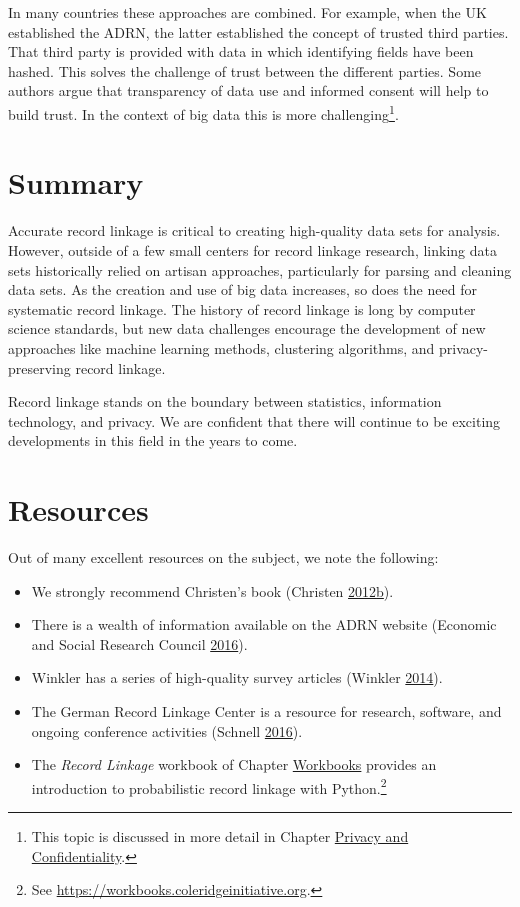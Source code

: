 \documentclass[]{krantz}
\begin{document}
In many countries these approaches are combined. For example, when the
UK established the ADRN, the latter established the concept of trusted
third parties. That third party is provided with data in which
identifying fields have been hashed. This solves the challenge of trust
between the different parties. Some authors argue that transparency of
data use and informed consent will help to build trust. In the context
of big data this is more challenging\footnote{This topic is discussed in
  more detail in Chapter \protect\hyperlink{chap:privacy}{Privacy and
  Confidentiality}.}.

\section{Summary}\label{summary-1}

Accurate record linkage is critical to creating high-quality data sets
for analysis. However, outside of a few small centers for record linkage
research, linking data sets historically relied on artisan approaches,
particularly for parsing and cleaning data sets. As the creation and use
of big data increases, so does the need for systematic record linkage.
The history of record linkage is long by computer science standards, but
new data challenges encourage the development of new approaches like
machine learning methods, clustering algorithms, and privacy-preserving
record linkage.

Record linkage stands on the boundary between statistics, information
technology, and privacy. We are confident that there will continue to be
exciting developments in this field in the years to come.

\section{Resources}\label{resources}

Out of many excellent resources on the subject, we note the following:

\begin{itemize}
\item
  We strongly recommend Christen's book (Christen
  \protect\hyperlink{ref-christen2012data}{2012}\protect\hyperlink{ref-christen2012data}{b}).
\item
  There is a wealth of information available on the ADRN website
  (Economic and Social Research Council
  \protect\hyperlink{ref-EconomicandSocialResearchCouncil2016}{2016}).
\item
  Winkler has a series of high-quality survey articles (Winkler
  \protect\hyperlink{ref-WICS:WICS1317}{2014}).
\item
  The German Record Linkage Center is a resource for research, software,
  and ongoing conference activities (Schnell
  \protect\hyperlink{ref-Schnell2016}{2016}).
\item
  The \emph{Record Linkage} workbook of Chapter
  \protect\hyperlink{chap:workbooks}{Workbooks} provides an introduction
  to probabilistic record linkage with Python.\footnote{See
    \url{https://workbooks.coleridgeinitiative.org}.}
\end{itemize}
\end{document}
